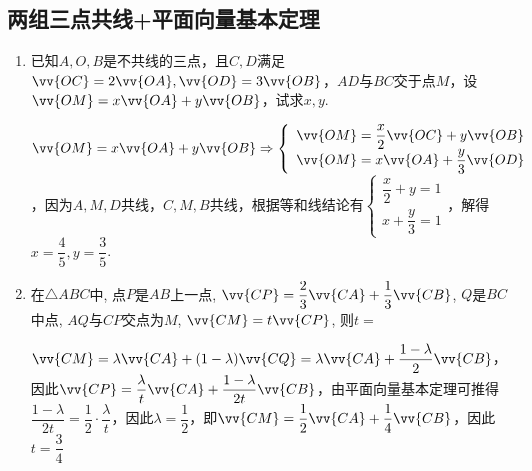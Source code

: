 \subsection*{两组三点共线+平面向量基本定理}
\begin{enumerate}
    \item 已知$A,O,B$是不共线的三点，且$C,D$满足$\vv{OC} = 2 \vv{OA}, \vv{OD} = 3 \vv{OB}$，$AD$与$BC$交于点$M$，设$\vv{OM} = x \vv{OA} + y \vv{OB}$，试求$x, y$.
    \begin{jieda}
        $\vv{OM} = x \vv{OA} + y \vv{OB} \Rightarrow \left \{ \begin{array}{l}
                \vv{OM} = \dfrac{x}{2}\vv{OC} + y\vv{OB}  \\
                \vv{OM} = x \vv{OA} + \dfrac{y}{3}\vv{OD} 
        \end{array} \right.$，因为$A, M, D$共线，$C, M, B$共线，根据等和线结论有$\left \{ \begin{array}{l}
                \dfrac{x}{2} + y = 1  \\
                x + \dfrac{y}{3} = 1 
        \end{array} \right.$，解得$x = \dfrac{4}{5}, y = \dfrac{3}{5}$.
    \end{jieda}
    \item 在$\triangle{ABC}$中, 点$P$是$AB$上一点, $\vv{CP}=\dfrac{2}{3}\vv{CA}+\dfrac{1}{3}\vv{CB}$, $Q$是$BC$中点, $AQ$与$CP$交点为$M$, $\vv{CM}=t\vv{CP}$, 则$t=$
    \begin{jieda}
        $\vv{CM} = \lambda \vv{CA} + (1-\lambda) \vv{CQ} = \lambda \vv{CA} + \dfrac{1-\lambda}{2} \vv{CB}$，因此$\vv{CP} = \dfrac{\lambda}{t} \vv{CA} + \dfrac{1-\lambda}{2t} \vv{CB}$，由平面向量基本定理可推得$\dfrac{1-\lambda}{2t} = \dfrac{1}{2} \cdot \dfrac{\lambda}{t}$，因此$\lambda = \dfrac{1}{2}$，即$\vv{CM} = \dfrac{1}{2}\vv{CA} + \dfrac{1}{4}\vv{CB}$，因此$t = \dfrac{3}{4}$
    \end{jieda}
\end{enumerate}
